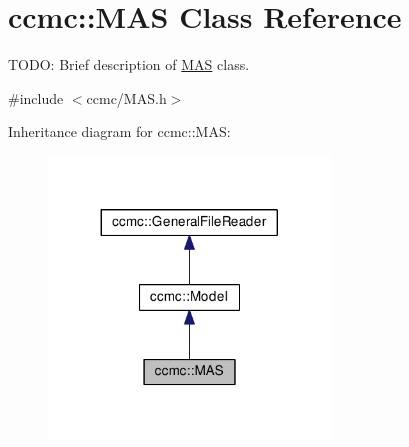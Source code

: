 \hypertarget{classccmc_1_1_m_a_s}{\section{ccmc\-:\-:M\-A\-S Class Reference}
\label{classccmc_1_1_m_a_s}
}


T\-O\-D\-O\-: Brief description of \hyperlink{classccmc_1_1_m_a_s}{M\-A\-S} class.  




{\ttfamily \#include $<$ccmc/\-M\-A\-S.\-h$>$}



Inheritance diagram for ccmc\-:\-:M\-A\-S\-:
\nopagebreak
\begin{figure}[H]
\begin{center}
\leavevmode
\includegraphics[width=212pt]{classccmc_1_1_m_a_s__inherit__graph}
\end{center}
\end{figure}


